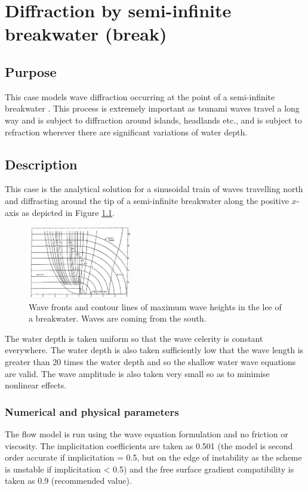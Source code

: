 \chapter{Diffraction by semi-infinite breakwater (break)}

\section{Purpose}

This case models wave diffraction occurring at the point of a semi-infinite
breakwater \cite{Penney1952}.
This process is extremely important as tsunami waves travel a long way and
is subject to diffraction around islands, headlands etc., and is subject to
refraction wherever there are significant variations of water depth.

\section{Description}

This case is the analytical solution for a sinusoidal train of waves travelling
north and diffracting around the tip of a semi-infinite breakwater along the
positive $x$-axis as depicted in Figure \ref{t2d:break:fig:AnalSol}.

\begin{figure}[!htbp]
 \centering
 \includegraphics[width=0.4\textwidth]{img/AnalyticSolutionBreak.png}
 \caption{Wave fronts and contour lines of maximum wave heights in the lee of a breakwater. Waves are coming from the south.}
 \label{t2d:break:fig:AnalSol}
\end{figure}

The water depth is taken uniform so that the wave celerity is constant everywhere.
The water depth is also taken sufficiently low that the wave length is greater
than 20 times the water depth and so the shallow water wave equations are valid.
The wave amplitude is also taken very small so as to minimise nonlinear effects.

\subsection{Numerical and physical parameters}
The  flow model is run using the wave equation formulation and no
friction or viscosity.
The implicitation coefficients are taken as 0.501 (the model is second order
accurate if implicitation = 0.5, but on the edge of instability as the scheme is
unstable if implicitation < 0.5) and the free surface gradient compatibility is
taken as 0.9 (recommended value).

